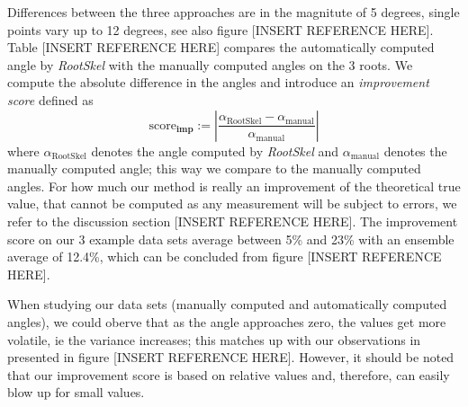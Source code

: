 Differences between the three approaches are in the magnitute of 5 degrees, single points vary up to 12 degrees, see also figure [INSERT REFERENCE HERE].
Table [INSERT REFERENCE HERE] compares the automatically computed angle by \textit{RootSkel} with the manually computed angles on the 3 roots. We compute the absolute difference in the angles and introduce an \textit{improvement score} defined as 
\[
 \text{score}_{\textbf{imp}} := | \frac{ \alpha_{\text{RootSkel}} - \alpha_{\text{manual}} }{\alpha_{\text{manual}}} |
\]
where $\alpha_{\text{RootSkel}}$ denotes the angle computed by \textit{RootSkel} and $\alpha_{\text{manual}}$ denotes the manually computed angle; this way we compare to the manually computed angles. For how much our method is really an improvement of the theoretical true value, that cannot be computed as any measurement will be subject to errors, we refer to the discussion section [INSERT REFERENCE HERE]. The improvement score on our 3 example data sets average between 5\% and 23\% with an ensemble average of 12.4\%, which can be concluded from figure [INSERT REFERENCE HERE].

When studying our data sets (manually computed and automatically computed angles), we could oberve that as the angle approaches zero, the values get more volatile, ie the variance increases; this matches up with our observations in presented in figure [INSERT REFERENCE HERE]. However, it should be noted that our improvement score is based on relative values and, therefore, can easily blow up for small values. %


